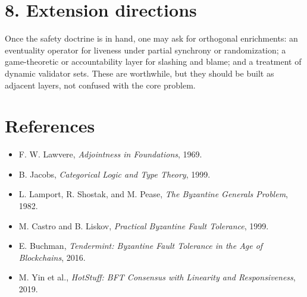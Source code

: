 \documentclass[11pt]{article}
\begin{document}
\section*{8. Extension directions}
Once the safety doctrine is in hand, one may ask for orthogonal enrichments: an eventuality operator for liveness under partial synchrony or randomization; a game-theoretic or accountability layer for slashing and blame; and a treatment of dynamic validator sets. These are worthwhile, but they should be built as adjacent layers, not confused with the core problem.

\section*{References}
\begin{itemize}
    \item F. W. Lawvere, \emph{Adjointness in Foundations}, 1969.
    \item B. Jacobs, \emph{Categorical Logic and Type Theory}, 1999.
    \item L. Lamport, R. Shostak, and M. Pease, \emph{The Byzantine Generals Problem}, 1982.
    \item M. Castro and B. Liskov, \emph{Practical Byzantine Fault Tolerance}, 1999.
    \item E. Buchman, \emph{Tendermint: Byzantine Fault Tolerance in the Age of Blockchains}, 2016.
    \item M. Yin et al., \emph{HotStuff: BFT Consensus with Linearity and Responsiveness}, 2019.
\end{itemize}
\end{document}
